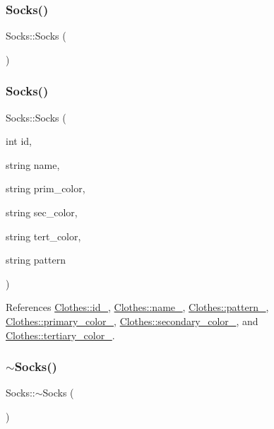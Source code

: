 \subsubsection{\texorpdfstring{Socks()}{Socks()}\hspace{0.1cm}{\footnotesize\ttfamily [1/2]}}
{\footnotesize\ttfamily Socks\+::\+Socks (\begin{DoxyParamCaption}{ }\end{DoxyParamCaption})}

\mbox{\label{classSocks_ab8f83e88b6131bbf22d75de7a41d241a}} 
\subsubsection{\texorpdfstring{Socks()}{Socks()}\hspace{0.1cm}{\footnotesize\ttfamily [2/2]}}
{\footnotesize\ttfamily Socks\+::\+Socks (\begin{DoxyParamCaption}\item[{int}]{id,  }\item[{string}]{name,  }\item[{string}]{prim\+\_\+color,  }\item[{string}]{sec\+\_\+color,  }\item[{string}]{tert\+\_\+color,  }\item[{string}]{pattern }\end{DoxyParamCaption})}



References \mbox{\hyperlink{classClothes_a8978d931db5ca47c3ccea30def4ae83e}{Clothes\+::id\+\_\+}}, \mbox{\hyperlink{classClothes_a7f2275aaae24224d60c48af922c31b65}{Clothes\+::name\+\_\+}}, \mbox{\hyperlink{classClothes_a1d40145a4eb6d28441f112f030ab5d35}{Clothes\+::pattern\+\_\+}}, \mbox{\hyperlink{classClothes_a7cb005bf6cbb7f4eaa40f1b31817559c}{Clothes\+::primary\+\_\+color\+\_\+}}, \mbox{\hyperlink{classClothes_ab8f55f67b956b25d71260cffcf273673}{Clothes\+::secondary\+\_\+color\+\_\+}}, and \mbox{\hyperlink{classClothes_a3c5f1e7ab531e3ba7a38b930da8078a0}{Clothes\+::tertiary\+\_\+color\+\_\+}}.

\mbox{\label{classSocks_a1791f54f1b29487892245c80cbe7c50b}} 
\subsubsection{\texorpdfstring{$\sim$\+Socks()}{~Socks()}}
{\footnotesize\ttfamily Socks\+::$\sim$\+Socks (\begin{DoxyParamCaption}{ }\end{DoxyParamCaption})\hspace{0.3cm}{\ttfamily [virtual]}}



